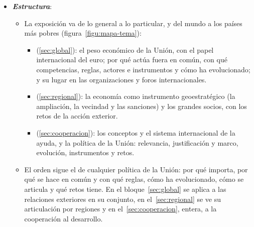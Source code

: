 \documentclass[11pt]{article}
\begin{document}
\begin{itemize}
\item \textbf{\emph{Estructura}}:
  \begin{itemize}
  \item La exposición va de lo general a lo particular, y del mundo a los países más pobres (figura~\ref{figu:mapa-tema}):
    \begin{itemize}
    \item {} (\ref{sec:global}): el peso económico de la Unión, con el papel internacional del euro; por qué actúa fuera en común, con qué competencias, reglas, actores e instrumentos y cómo ha evolucionado; y su lugar en las organizaciones y foros internacionales.
    \item {} (\ref{sec:regional}): la economía como instrumento geoestratégico (la ampliación, la vecindad y las sanciones) y los grandes socios, con los retos de la acción exterior.
    \item {} (\ref{sec:cooperacion}): los conceptos y el sistema internacional de la ayuda, y la política de la Unión: relevancia, justificación y marco, evolución, instrumentos y retos.
    \end{itemize}
  \item El orden sigue el de cualquier política de la Unión: por qué importa, por qué se hace en común y con qué reglas, cómo ha evolucionado, cómo se articula y qué retos tiene. En el bloque~\ref{sec:global} se aplica a las relaciones exteriores en su conjunto, en el~\ref{sec:regional} se ve su articulación por regiones y en el~\ref{sec:cooperacion}, entera, a la cooperación al desarrollo.
  \end{itemize}
\end{itemize}
\end{document}

